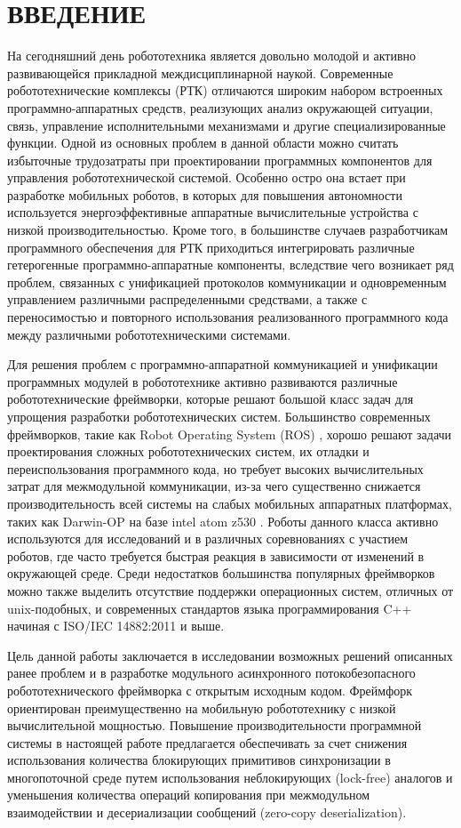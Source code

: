 \chapter*{ВВЕДЕНИЕ}

На сегодняшний день робототехника является довольно молодой и активно 
развивающейся прикладной междисциплинарной наукой. Современные 
робототехнические комплексы (РТК) отличаются широким набором встроенных 
программно-аппаратных средств, реализующих анализ окружающей ситуации, связь, 
управление исполнительными механизмами и другие специализированные функции. 
Одной из основных проблем в данной области можно считать избыточные 
трудозатраты при проектировании программных компонентов для управления 
робототехнической системой. Особенно остро она встает при разработке мобильных 
роботов, в которых для повышения автономности используется энергоэффективные 
аппаратные вычислительные устройства с низкой производительностью. Кроме того, 
в большинстве случаев разработчикам программного обеспечения для РТК 
приходиться интегрировать различные гетерогенные программно-аппаратные 
компоненты, вследствие чего возникает ряд проблем, связанных с унификацией 
протоколов коммуникации и одновременным управлением различными распределенными 
средствами, а также с переносимостью и повторного использования реализованного 
программного кода между различными робототехническими системами.

Для решения проблем с программно-аппаратной коммуникацией и унификации 
программных модулей в робототехнике активно развиваются различные 
робототехнические фреймворки, которые решают большой класс задач для упрощения разработки робототехнических систем. Большинство современных фреймворков, такие как Robot Operating System (ROS) \cite{quigley2009ros}, хорошо решают задачи проектирования сложных робототехнических систем, их отладки и переиспользования программного кода, но требует высоких вычислительных затрат для межмодульной коммуникации, из-за чего существенно снижается производительность всей системы на слабых мобильных аппаратных платформах, таких как Darwin-OP на базе intel atom z530 \cite{ha2011development}. Роботы данного класса активно используются для исследований и в различных соревнованиях с участием роботов, где часто требуется быстрая реакция в зависимости от изменений в окружающей среде. Среди недостатков большинства популярных фреймворков можно также выделить отсутствие поддержки операционных систем, отличных от unix-подобных, и современных стандартов языка программирования C++ начиная с ISO/IEC 14882:2011 \cite{c++2011iso} и выше.

Цель данной работы заключается в исследовании возможных решений описанных ранее проблем и в разработке модульного асинхронного потокобезопасного робототехнического фреймворка с открытым исходным кодом. Фреймфорк ориентирован преимущественно на мобильную робототехнику с низкой вычислительной мощностью. Повышение производительности программной системы в настоящей работе предлагается обеспечивать за счет снижения использования количества блокирующих примитивов синхронизации в многопоточной среде путем использования неблокирующих (lock-free) аналогов и уменьшения количества операций копирования при межмодульном взаимодействии и десериализации сообщений (zero-copy deserialization).
